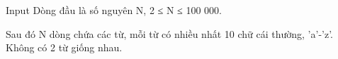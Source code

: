 Input
Dòng đầu là số nguyên N, 2 ≤ N ≤ 100 000.

Sau đó N dòng chứa các từ, mỗi từ có nhiều nhất 10 chữ cái thường, 'a'-'z'. Không có 2 từ giống nhau.